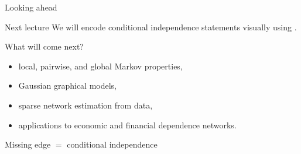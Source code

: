 \documentclass[dvipsnames,aspectratio=169,handout]{beamer}
\begin{document}
\begin{frame}{Looking ahead}
\begin{block}{Next lecture}
We will encode conditional independence statements visually using .
\end{block}

\begin{alertblock}{What will come next?}
\begin{itemize}
    \item local, pairwise, and global Markov properties,
    \item Gaussian graphical models,
    \item sparse network estimation from data,
    \item applications to economic and financial dependence networks.
\end{itemize}
\end{alertblock}

\begin{center}
{\Large Missing edge $=$ conditional independence}
\end{center}
\end{frame}
\end{document}
